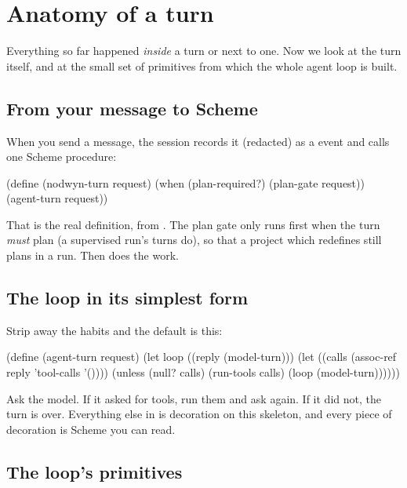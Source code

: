 \chapter{Anatomy of a turn}
\label{ch:turn}

Everything so far happened \emph{inside} a turn or next to one. Now we look
at the turn itself, and at the small set of primitives from which the whole
agent loop is built.

\section{From your message to Scheme}

When you send a message, the session records it (redacted) as a
 event and calls one Scheme procedure:

\begin{scm}
(define (nodwyn-turn request)
  (when (plan-required?) (plan-gate request))
  (agent-turn request))
\end{scm}

That is the real definition, from . The
plan gate only runs first when the turn \emph{must} plan (a supervised
run's turns do), so that a project which redefines  still
plans in a run. Then  does the work.

\section{The loop in its simplest form}

Strip away the habits and the default  is this:

\begin{scm}
(define (agent-turn request)
  (let loop ((reply (model-turn)))
    (let ((calls (assoc-ref reply 'tool-calls '())))
      (unless (null? calls)
        (run-tools calls)
        (loop (model-turn))))))
\end{scm}

Ask the model. If it asked for tools, run them and ask again. If it did
not, the turn is over. Everything else in  is
decoration on this skeleton, and every piece of decoration is Scheme you can
read.

\section{The loop's primitives}

